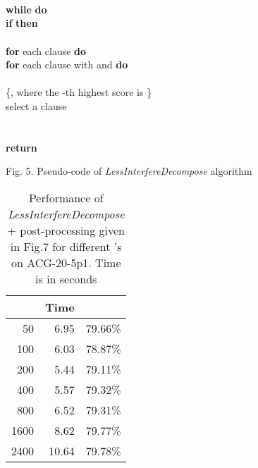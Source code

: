 \documentclass{llncs}
\begin{document}
\begin{flushleft}
\begin{sf}
\begin{footnotesize}

\hskip 12mm \\
\hskip 16mm \\
\hskip 16mm \\
\hskip 16mm {\bf while }  {\bf do}\\
\hskip 20mm    {\bf if }  {\bf then} \\
\hskip 25mm     \\
\hskip 25mm        {\bf for } each clause {\bf do}\\
\hskip 28mm           {\bf for } each clause  with  and  {\bf do}\\
\hskip 32mm              \\
\hskip 25mm          \{, where the -th highest score is \}\\
\hskip 20mm    select a clause \\
\hskip 20mm    \\
\hskip 20mm    \\
\hskip 16mm {\bf return} 

\vspace{1em} \hskip 8mm \textrm{Fig. 5. Pseudo-code of
\emph{LessInterfereDecompose} algorithm}
\end{footnotesize}
\end{sf}
\end{flushleft}

\begin{table}
\caption{ Performance of \emph{LessInterfereDecompose} +
post-processing given in Fig.7 for different 's on
ACG-20-5p1. Time is in seconds}

\begin{center}
\renewcommand{\arraystretch}{0.95}
\setlength\tabcolsep{4pt}
\begin{tabular}{|r|r|c|}
\hline  \hline \  & Time &  \\
 \hline
50  & 6.95 &  79.66\% \\
100 & 6.03 &  78.87\% \\
200 & 5.44 &   79.11\% \\
400 & 5.57 &   79.32\% \\
800 & 6.52 &  79.31\% \\
1600 &   8.62  &  79.77\% \\
2400 &   10.64  & 79.78\% \\

 \hline
\end{tabular}
\end{center}
\end{table}
\end{document}
